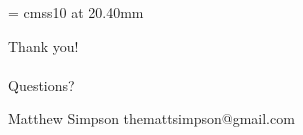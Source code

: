 \documentclass[xcolor=dvipsnames]{beamer}
\begin{document}
\begin{frame}
      \begin{center}

        \font\endfont = cmss10 at 20.40mm
        \color{Red}
        \endfont
        \baselineskip 20.0mm

        Thank you!\\~\\

        Questions?

      \end{center}
\vspace{.4cm}
Matthew Simpson \hfill themattsimpson@gmail.com
\end{frame}
\end{document}
